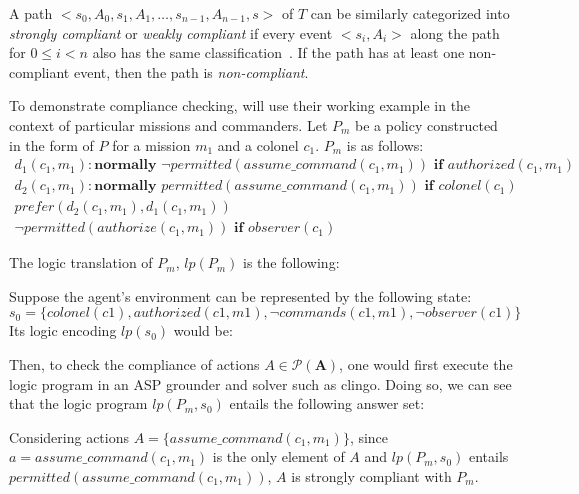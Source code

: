 \begin{definition}
    \label{def:authorization_path_compliance}
    A path $<s_0, A_0, s_1, A_1, \dots, s_{n-1}, A_{n-1}, s>$ of $T$ can be similarly categorized into \textit{strongly compliant} or \textit{weakly compliant} if every event $<s_i, A_i>$ along the path for $0 \le i < n$ also has the same classification~\citep{gelfond_authorization_2008}.
    If the path has at least one non-compliant event, then the path is \textit{non-compliant}.
\end{definition}

To demonstrate compliance checking, \citet{gelfond_authorization_2008} will use their working example in the context of particular missions and commanders.
Let $P_m$ be a policy constructed in the form of $P$ for a mission $m_1$ and a colonel $c_1$.
$P_m$ is as follows:
\begin{gather*}
    d_1(c_1, m_1): \textbf{normally } \neg permitted(assume\_command(c_1, m_1)) \textbf{ if } authorized(c_1, m_1) \\
    d_2(c_1, m_1): \textbf{normally } permitted(assume\_command(c_1, m_1)) \textbf{ if } colonel(c_1) \\
    prefer(d_2(c_1,m_1),d_1(c_1,m_1)) \\
    \neg permitted(authorize(c_1, m_1)) \textbf{ if } observer(c_1)
\end{gather*}

The logic translation of $P_m$, $lp(P_m)$ is the following:


Suppose the agent's environment can be represented by the following state:
\[
s_0 = \{colonel(c1), authorized(c1,m1), \neg commands(c1,m1), \neg observer(c1) \}
\]
Its logic encoding $lp(s_0)$ would be:


Then, to check the compliance of actions $A \in \mathcal{P}(\boldsymbol{A})$, one would first execute the logic program in an ASP grounder and solver such as clingo.
Doing so, we can see that the logic program $lp(P_m, s_0)$ entails the following answer set:


Considering actions $A=\{assume\_command(c_1, m_1)\}$, since $a = assume\_command(c_1, m_1)$ is the only element of $A$ and $lp(P_m, s_0)$ entails $permitted(assume\_command(c_1, m_1))$, $A$ is strongly compliant with $P_m$.

